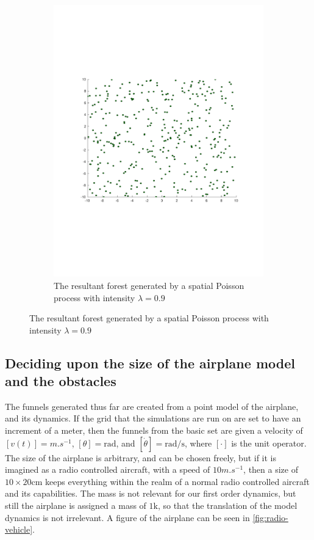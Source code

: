 \begin{figure}
\begin{subfigure}[b]{0.5\textwidth}
    \includegraphics[width=\textwidth, trim={0cm 6cm 0cm
      5cm}]{figures/experiments/poisson09}
    \caption{The resultant forest generated by a spatial Poisson process with
      intensity \(\lambda = 0.9\)}
    \label{fig:poisson09}
  \end{subfigure}
\end{figure}

\subsection{Deciding upon the size of the airplane model and the obstacles}
\label{subsec:deciding-model-size}

The funnels generated thus far are created from a point model of the airplane,
and its dynamics. If the grid that the simulations are run on are set to have an
increment of a meter, then the funnels from the basic set are given a velocity
of \([v(t)] = \si{m.s^{-1}}\), \([\theta] = \si{\radian}\), and \([\dot{\theta}]
= \si{\radian\per\second}\), where \([\cdot]\) is the unit operator. The size of
the airplane is arbitrary, and can be chosen freely, but if it is imagined as a
radio controlled aircraft, with a speed of \(10\si{m.s^{-1}}\), then a size of
\(10 \times 20 \si{\centi\metre} \) keeps everything within the realm of a
normal radio controlled aircraft and its capabilities. The mass is not relevant
for our first order dynamics, but still the airplane is assigned a mass of \(1
\si{\kilo}\), so that the translation of the model dynamics is not irrelevant. A
figure of the airplane can be seen in \cref{fig:radio-vehicle}.


